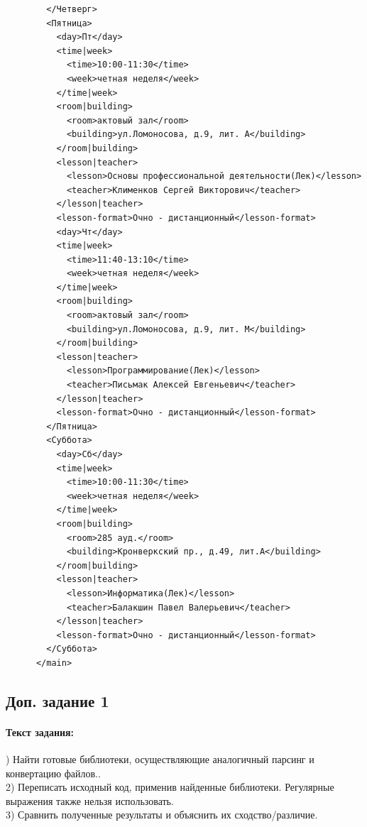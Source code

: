 \documentclass[12pt,onecolumn]{article}
\begin{document}
\begin{flushleft}
\begin{verbatim}
        </Четверг>
        <Пятница>
          <day>Пт</day>
          <time|week>
            <time>10:00-11:30</time>
            <week>четная неделя</week>
          </time|week>
          <room|building>
            <room>актовый зал</room>
            <building>ул.Ломоносова, д.9, лит. А</building>
          </room|building>
          <lesson|teacher>
            <lesson>Основы профессиональной деятельности(Лек)</lesson>
            <teacher>Клименков Сергей Викторович</teacher>
          </lesson|teacher>
          <lesson-format>Очно - дистанционный</lesson-format>
          <day>Чт</day>
          <time|week>
            <time>11:40-13:10</time>
            <week>четная неделя</week>
          </time|week>
          <room|building>
            <room>актовый зал</room>
            <building>ул.Ломоносова, д.9, лит. М</building>
          </room|building>
          <lesson|teacher>
            <lesson>Программирование(Лек)</lesson>
            <teacher>Письмак Алексей Евгеньевич</teacher>
          </lesson|teacher>
          <lesson-format>Очно - дистанционный</lesson-format>
        </Пятница>
        <Суббота>
          <day>Сб</day>
          <time|week>
            <time>10:00-11:30</time>
            <week>четная неделя</week>
          </time|week>
          <room|building>
            <room>285 ауд.</room>
            <building>Кронверкский пр., д.49, лит.А</building>
          </room|building>
          <lesson|teacher>
            <lesson>Информатика(Лек)</lesson>
            <teacher>Балакшин Павел Валерьевич</teacher>
          </lesson|teacher>
          <lesson-format>Очно - дистанционный</lesson-format>
        </Суббота>
      </main>
    \end{verbatim}  
\endgroup
\subsection{Доп. задание 1}
\paragraph{Текст задания:}
\hfill {}) Найти готовые библиотеки, осуществляющие аналогичный парсинг и конвертацию файлов..\\
2) Переписать исходный код, применив найденные библиотеки. Регулярные выражения также нельзя использовать.\\
3) Сравнить полученные результаты и объяснить их сходство/различие.\\

\end{flushleft}
\end{document}
